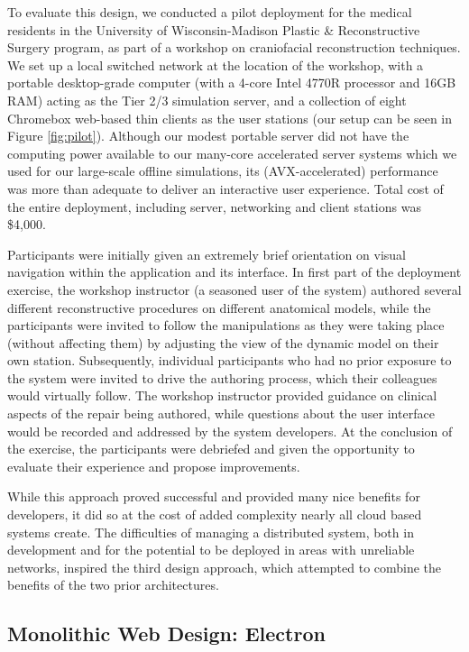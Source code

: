  To evaluate this design, we conducted a pilot deployment for the
 medical residents in the University of Wisconsin-Madison Plastic \&
 Reconstructive Surgery program, as part of a workshop on craniofacial
 reconstruction techniques. We set up a local switched network at the
 location of the workshop, with a portable desktop-grade computer
 (with a 4-core Intel 4770R processor and 16GB RAM) acting as the Tier
 2/3 simulation server, and a collection of eight Chromebox web-based
 thin clients as the user stations (our setup can be seen in Figure
 \ref{fig:pilot}). Although our modest portable server did not have
 the computing power available to our many-core accelerated server
 systems which we used for our large-scale offline simulations, its
 (AVX-accelerated) performance was more than adequate to deliver an
 interactive user experience. Total cost of the entire deployment,
 including server, networking and client stations was \$4,000.

  Participants were initially given an extremely brief orientation on
  visual navigation within the application and its interface. In first
  part of the deployment exercise, the workshop instructor (a seasoned
  user of the system) authored several different reconstructive
  procedures on different anatomical models, while the participants
  were invited to follow the manipulations as they were taking place
  (without affecting them) by adjusting the view of the dynamic model
  on their own station. Subsequently, individual participants who had
  no prior exposure to the system were invited to drive the authoring
  process, which their colleagues would virtually follow. The workshop
  instructor provided guidance on clinical aspects of the repair being
  authored, while questions about the user interface would be recorded
  and addressed by the system developers. At the conclusion of the
  exercise, the participants were debriefed and given the opportunity
  to evaluate their experience and propose improvements.

  While this approach proved successful and provided many nice
  benefits for developers, it did so at the cost of added complexity
  nearly all cloud based systems create. The difficulties of managing
  a distributed system, both in development and for the potential to
  be deployed in areas with unreliable networks, inspired the third
  design approach, which attempted to combine the benefits of the two
  prior architectures.
 
 \subsection{Monolithic Web Design: Electron}


